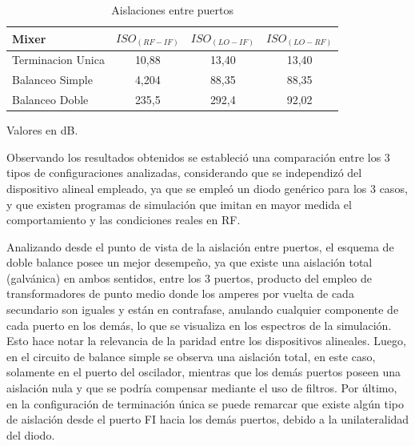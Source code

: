 \documentclass[twocolumn]{article}
\begin{document}
\begin{table}[h]
	\begin{adjustbox}{width=\columnwidth,center}
  \begin{threeparttable}
     \begin{tabular}{lccc}
        \toprule
        Mixer 				&$ISO_{(RF-IF)}$ 	& $ISO_{(LO-IF)}$ 	& $ISO_{(LO-RF)}$ \\
        \midrule
        Terminacion Unica   & 10,88        		& 13,40    			& 13,40 \\
        Balanceo Simple     & 4,204        		& 88,35    			& 88,35 \\
        Balanceo Doble    	& 235,5        		& 292,4    			& 92,02 \\
        \bottomrule
     \end{tabular}
    \begin{tablenotes}
      \small
      \item Valores en dB.
    \end{tablenotes}
    \caption{Aislaciones entre puertos}
  \end{threeparttable}
  \end{adjustbox}
\end{table}

Observando los resultados obtenidos se estableció una comparación entre los 3 tipos de configuraciones analizadas, considerando que se independizó del dispositivo alineal empleado, ya que se empleó un diodo genérico para los 3 casos, y que existen programas de simulación que imitan en mayor medida el comportamiento y las condiciones reales en RF. 

Analizando desde el punto de vista de la aislación entre puertos, el esquema de doble balance posee un mejor desempeño, ya que existe una aislación total (galvánica) en ambos sentidos, entre los 3 puertos, producto del empleo de transformadores de punto medio donde los amperes por vuelta de cada secundario son iguales y están en contrafase, anulando cualquier componente de cada puerto en los demás, lo que se visualiza en los espectros de la simulación. Esto hace notar la relevancia de la paridad entre los dispositivos alineales. Luego, en el circuito de balance simple se observa una aislación total, en este caso, solamente en el puerto del oscilador, mientras que los demás puertos poseen una aislación nula y que se podría compensar mediante el uso de filtros. Por último, en la configuración de terminación única se puede remarcar que existe algún tipo de aislación desde el puerto FI hacia los demás puertos, debido a la unilateralidad del diodo.
\end{document}
